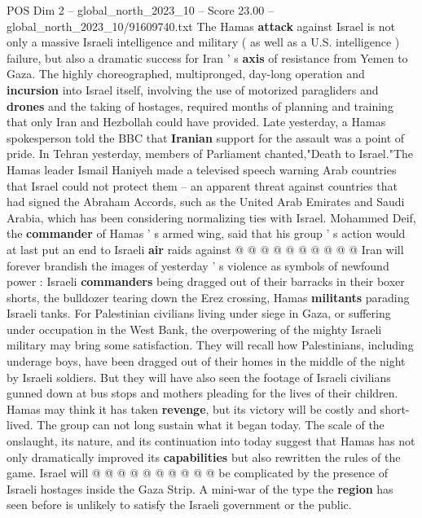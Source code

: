 \begin{textsample}{POS Dim 2 – global\_north\_2023\_10 – Score 23.00 – global\_north\_2023\_10/91609740.txt}  \label{ex:f2_pos_147}
The Hamas \textbf{attack} against Israel is not only a massive Israeli intelligence and military ( as well as a U.S. intelligence ) failure, but also a dramatic success for Iran ' s \textbf{axis} of resistance from Yemen to Gaza.
The highly choreographed, multipronged, day-long operation and \textbf{incursion} into Israel itself, involving the use of motorized paragliders and \textbf{drones} and the taking of hostages, required months of planning and training that only Iran and Hezbollah could have provided.
Late yesterday, a Hamas spokesperson told the BBC that \textbf{Iranian} support for the assault was a point of pride.
In Tehran yesterday, members of Parliament chanted,"Death to Israel."The Hamas leader Ismail Haniyeh made a televised speech warning Arab countries that Israel could not protect them -- an apparent threat against countries that had signed the Abraham Accords, such as the United Arab Emirates and Saudi Arabia, which has been considering normalizing ties with Israel.
Mohammed Deif, the \textbf{commander} of Hamas ' s armed wing, said that his group ' s action would at last put an end to Israeli \textbf{air} raids against @ @ @ @ @ @ @ @ @ @ Iran will forever brandish the images of yesterday ' s violence as symbols of newfound power : Israeli \textbf{commanders} being dragged out of their barracks in their boxer shorts, the bulldozer tearing down the Erez crossing, Hamas \textbf{militants} parading Israeli tanks.
For Palestinian civilians living under siege in Gaza, or suffering under occupation in the West Bank, the overpowering of the mighty Israeli military may bring some satisfaction.
They will recall how Palestinians, including underage boys, have been dragged out of their homes in the middle of the night by Israeli soldiers.
But they will have also seen the footage of Israeli civilians gunned down at bus stops and mothers pleading for the lives of their children.
Hamas may think it has taken \textbf{revenge}, but its victory will be costly and short-lived.
The group can not long sustain what it began today.
The scale of the onslaught, its nature, and its continuation into today suggest that Hamas has not only dramatically improved its \textbf{capabilities} but also rewritten the rules of the game.
Israel will @ @ @ @ @ @ @ @ @ @ be complicated by the presence of Israeli hostages inside the Gaza Strip.
A mini-war of the type the \textbf{region} has seen before is unlikely to satisfy the Israeli government or the public.

\end{textsample}
